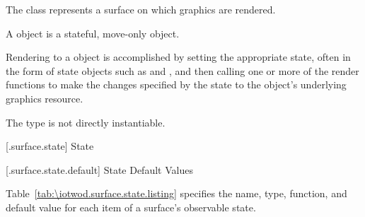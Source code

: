 \pnum
{}
The  class represents a surface on which graphics are rendered.

\pnum
A  object is a stateful, move-only object.

\pnum
Rendering to a  object is accomplished by setting the appropriate state, often in the form of state objects such as  and , and then calling one or more of the render functions to make the changes specified by the state to the  object's underlying graphics resource.

\pnum
The  type is not directly instantiable.

 [\iotwod.surface.state] { State}

 [\iotwod.surface.state.default] { State Default Values}

\pnum
Table~\ref{tab:\iotwod.surface.state.listing} specifies the name, type, function, and default value for each item of a surface's observable state.

